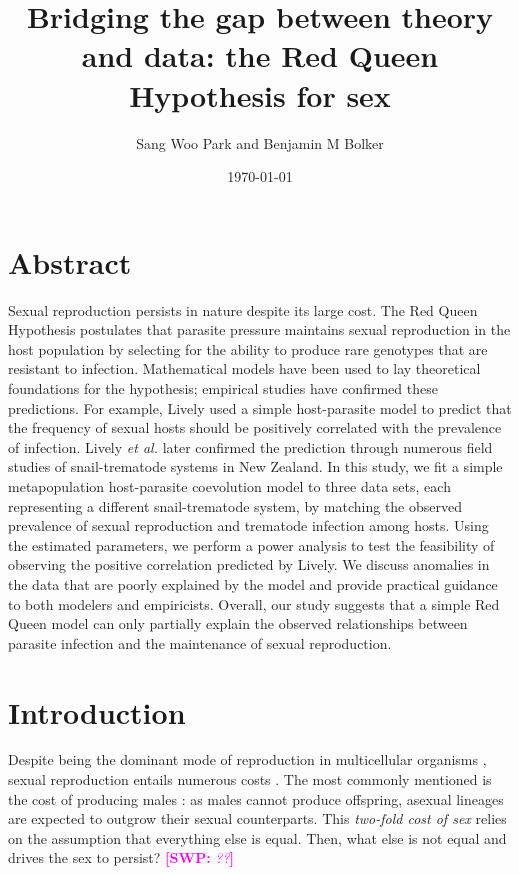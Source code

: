 \documentclass{article}\usepackage[]{graphicx}\usepackage[]{color}
\title{Bridging the gap between theory and data: the Red Queen Hypothesis for sex}
\author{Sang Woo Park and Benjamin M Bolker}
\date{\today}
\newcommand{\comment}[3]{\textcolor{#1}{\textbf{[#2: }\textit{#3}\textbf{]}}}
\newcommand{\swp}[1]{\comment{magenta}{SWP}{#1}}
\begin{document}
\maketitle

\section*{Abstract}

Sexual reproduction persists in nature despite its large cost.
The Red Queen Hypothesis postulates that parasite pressure maintains sexual reproduction in the host population by selecting for the ability to produce rare genotypes that are resistant to infection.
Mathematical models have been used to lay theoretical foundations for the hypothesis; empirical studies have confirmed these predictions.
For example, Lively used a simple host-parasite model to predict that the frequency of sexual hosts should be positively correlated with the prevalence of infection. 
Lively \textit{et al.} later confirmed the prediction through numerous field studies of snail-trematode systems in New Zealand.
In this study, we fit a simple metapopulation host-parasite coevolution model to three data sets, each representing a different snail-trematode system, by matching the observed prevalence of sexual reproduction and trematode infection among hosts.
Using the estimated parameters, we perform a power analysis to test the feasibility of observing the positive correlation predicted by Lively.
We discuss anomalies in the data that are poorly explained by the model and provide practical guidance to both modelers and empiricists.
Overall, our study suggests that a simple Red Queen model can only partially explain the observed relationships between parasite infection and the maintenance of sexual reproduction.

\section{Introduction}

Despite being the dominant mode of reproduction in multicellular organisms \citep{vrijenhoek1998animal}, sexual reproduction entails numerous costs \citep{lehtonen2012many}.
The most commonly mentioned is the cost of producing males \citep{smith1978evolution}:
as males cannot produce offspring, asexual lineages are expected to outgrow their sexual counterparts.
This \emph{two-fold cost of sex} \citep{smith1978evolution} relies on the assumption that everything else is equal.
Then, what else is not equal and drives the sex to persist?
\swp{??}
\end{document}
